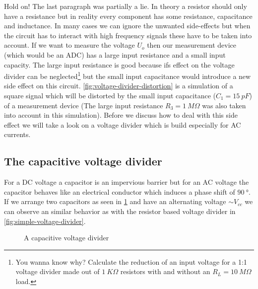 Hold on! The last paragraph was partially a lie. In theory a resistor should only have a resistance but in reality every component has some resistance, capacitance and inductance. In many cases we can ignore the unwanted side-effects but when the circuit has to interact with high frequency signals these have to be taken into account. If we want to measure the voltage $U_o$ then our measurement device (which would be an ADC) has a large input resistance and a small input capacity. The large input resistance is good because ifs effect on the voltage divider can be neglected\footnote{You wanna know why? Calculate the reduction of an input voltage for a 1:1 voltage divider made out of $\SI{1}{K\Omega}$ resistors with and without an $R_L = \SI{10}{M\Omega}$ load.} but the small input capacitance would introduce a new side effect on this circuit. \cref{fig:voltage-divider-distortion} is a simulation of a square signal which will be distorted by the small input capacitance ($C_1 = \SI{15}{pF}$) of a measurement device (The large input resistance $R_3 = \SI{1}{M\Omega}$ was also taken into account in this simulation). Before we discuss how to deal with this side effect we will take a look on a voltage divider which is build especially for AC currents.


\subsection{The capacitive voltage divider}

For a DC voltage a capacitor is an impervious barrier but for an AC voltage the capacitor behaves like an electrical conductor which induces a phase shift of $\SI{90}{\degree}$. If we arrange two capacitors as seen in \cref{fig:capacitive-voltage-divider} and have an alternating voltage $\sim V_{cc}$ we can observe an similar behavior as with the resistor based voltage divider in \cref{fig:simple-voltage-divider}.


\begin{figure}[htb]
	\centering
	\caption{A capacitive voltage divider}
	\label{fig:capacitive-voltage-divider}
\end{figure}


